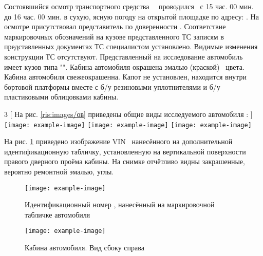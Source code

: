  {Состоявшийся осмотр транспортного средства \, \, проводился \osm\, с 15 час. 00 мин. до 16 час. 00 мин. в сухую, ясную погоду  на открытой площадке по адресу: . На осмотре присутствовал представитель по доверенности  .  %
		Соответствие маркировочных обозначений на кузове представленного ТС записям в представленных документах ТС  специалистом установлено. Видимые изменения конструкции ТС отсутствуют.  Представленный на исследование автомобиль \tc\, имеет кузов типа "". Кабина автомобиля окрашена 		эмалью (краской) \colr\, цвета. Кабина автомобиля свежеокрашенна. Капот не установлен, находится внутри бортовой платформы вместе с б/у резиновыми уплотнителями и б/у пластиковыми облицовками кабины.   
		
		
		
		\begin{multicols}{3}
			[
		На рис. \ref{ris:images/ов} приведены общие виды  исследуемого автомобиля :
			]
			\noindent	\texttt{[image: example-image]}
			\columnbreak
			\texttt{[image: example-image]}
			\columnbreak
			\texttt{[image: example-image]}
			\end{multicols}			
				\label{ris:images/ов}
		
		\vspace{3mm}
		
		На рис. \ref{ris:images/вин} приведено изображение VIN \vin\, нанесённого на дополнительной идентификационную  табличку, установленную на вертикальной поверхности правого дверного проёма кабины.  На снимке отчётливо видны закрашенные, вероятно ремонтной эмалью, углы.
			
		
		\begin{figure}[H]
			\centering
			\texttt{[image: example-image]}
			\caption{{\footnotesize {Идентификационный номер , нанесённый на маркировочной табличке автомобиля \, }}}
			\label{ris:images/вин}
		\end{figure}
		
		
		
		
		
		
\begin{figure}[H]
	\centering
	\texttt{[image: example-image]}
	\caption{{\footnotesize {Кабина автомобиля. Вид сбоку справа}}}
	\label{справа}
\end{figure}






}
